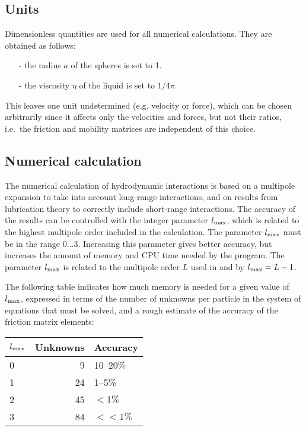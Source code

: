 \documentclass[12pt]{article}
\begin{document}
\subsection{Units}

Dimensionless quantities are used for all numerical calculations.
They are obtained as follows:
\begin{itemize}
\item[-] the radius $a$ of the spheres is set to 1.
\item[-] the viscosity $\eta$ of the liquid is set to $1/4\pi$.
\end{itemize}
This leaves one unit undetermined (e.g. velocity or force), which can
be chosen arbitrarily since it affects only the velocities and forces,
but not their ratios, i.e.\ the friction and mobility matrices are
independent of this choice.

\subsection{Numerical calculation}
\label{sec:numcalc}

The numerical calculation of hydrodynamic interactions is based on a
multipole expansion to take into account long-range interactions, and
on results from lubrication theory to correctly include short-range
interactions. The accuracy of the results can be controlled with the
integer parameter $l_{\rm max}$, which is related to the highest
multipole order included in the calculation. The parameter $l_{\rm
max}$ must be in the range $0\ldots 3$. Increasing this parameter
gives better accuracy, but increases the amount of memory and CPU time
needed by the program. The parameter $l_{\rm max}$ is related to
the multipole order $L$ used in \cite{cifehiwabl} and \cite{hi}
by $l_{\rm max} = L-1$.

The following table indicates how much memory is needed for a given
value of $l_{\rm max}$, expressed in terms of the number of unknowns
per particle in the system of equations that must be solved, and a
rough estimate of the accuracy of the friction matrix elements:

\begin{center}
\begin{tabular}{|l|r|l|}
\hline
$l_{\rm max}$ & Unknowns & Accuracy\\
\hline
0 & 9 & 10--20\% \\
1 & 24 & 1--5\% \\
2 & 45 & $< 1\%$ \\
3 & 84 & $<< 1\%$ \\
\hline
\end{tabular}
\end{center}
\end{document}
